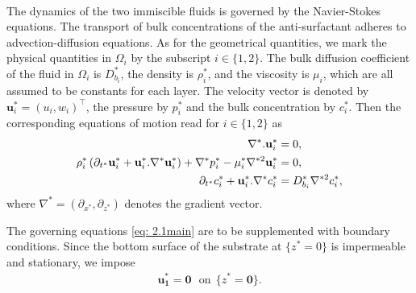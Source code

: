 \documentclass[11pt]{article}
\numberwithin{equation}{section}
\newtheorem{counter example}[theorem]{Counter Example}
\begin{document}
{\begin{align*}
\end{align*}
The dynamics of the two immiscible fluids is governed by the Navier-Stokes equations. The transport of bulk concentrations of the anti-surfactant adheres to advection-diffusion equations. As for the geometrical quantities, we mark the physical quantities in $\Omega_i$ by the subscript $i\in \{1, 2\}$. The bulk diffusion coefficient of the fluid in $\Omega_i$ is $D_{b_i}^*$, the density is $\rho_i^*$, and the viscosity is $\mu_i$, which are all assumed to be constants for each layer. The velocity vector is denoted by $\mathbf{u}_i^*=(u_i, w_i)^\top$, the pressure by $p_i^*$ and the bulk concentration by $c_i^*$. Then the corresponding equations of motion read for $i\in \{ 1, 2\}$ as \cite{picardo2015modelling}
\begin{align}\label{eq: 2.1main}
    \hspace{5.3 cm} \nabla^*. \mathbf{u}_i^*&=0, \nonumber\\
    \rho_i^*\left(\partial_{t^*} \mathbf{u}_i^*+\mathbf{u}_i^*. \nabla^* \mathbf{u}_i^*\right)+\nabla^* p_i^*-\mu_i^* \nabla^{*2} \mathbf{u}_i^*&=0,\vspace{0.15 cm}\nonumber\\
 \hspace{3.8 cm} \partial_{t^*} c_i^*+\mathbf{u}_i^*.\nabla^* c_i^*&=D_{b_i}^* \nabla^{*2} c_i^*,
\end{align}
where $\nabla^*=\left(\partial_{ x^*},  \partial_{ z^*}\right)$ denotes the gradient vector. 

The governing equations \eqref{eq: 2.1main} are to be supplemented with boundary conditions. Since the bottom surface of the substrate at $\{z^*=0\}$ is impermeable and stationary, we impose 
\begin{align}
    \mathbf{u_1^*}=\mathbf{0} ~~~\mathrm{on}~~\{z^*=\mathbf{0}\}.
\end{align}

}
\end{document}
